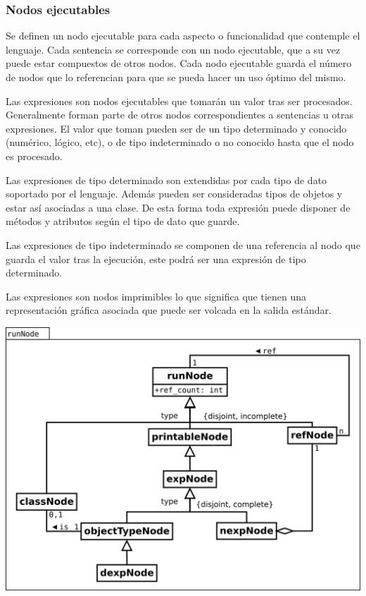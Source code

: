 \subsubsection{Nodos ejecutables}
Se definen un nodo ejecutable para cada aspecto o funcionalidad que contemple el lenguaje.
Cada sentencia se corresponde con un nodo ejecutable, que a su vez puede estar compuestos de otros
nodos. Cada nodo ejecutable guarda el número de nodos que lo referencian para que se pueda hacer un uso 
óptimo del mismo.

Las expresiones son nodos ejecutables que tomarán un valor tras ser procesados. Generalmente forman parte de otros 
nodos correspondientes a sentencias u otras expresiones. El valor que toman pueden ser de un tipo determinado y conocido (numérico, lógico, etc), 
o de tipo indeterminado o no conocido hasta que el nodo es procesado. 

Las expresiones de tipo determinado son extendidas por cada tipo de dato soportado por el lenguaje. Además 
pueden ser consideradas tipos de objetos y estar así asociadas a una clase. De esta forma toda expresión puede disponer
de métodos y atributos según el tipo de dato que guarde.

Las expresiones de tipo indeterminado se componen de una referencia al nodo que guarda el valor tras la ejecución, este podrá ser una 
expresión de tipo determinado.

Las expresiones son nodos imprimibles lo que significa que tienen una representación gráfica asociada que puede ser volcada en la
salida estándar.

\begin{center}
\includegraphics[scale=0.4]{runNode.png} \\
\end{center}
\pagebreak

